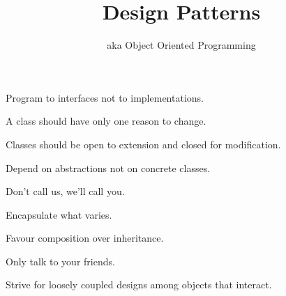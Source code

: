 \documentclass{beamer}
\title{Design Patterns}
\subtitle{aka Object Oriented Programming}
\begin{document}
\begin{frame}
  \titlepage
\end{frame}

\begin{frame}{Program to interfaces not to implementations.}
    \begin{itemize}
    \end{itemize}
\end{frame}

\begin{frame}{A class should have only one reason to change.}
    \begin{itemize}
    \end{itemize}
\end{frame}

\begin{frame}{Classes should be open to extension and closed for modification.}
    \begin{itemize}
    \end{itemize}
\end{frame}

\begin{frame}{Depend on abstractions not on concrete classes.}
    \begin{itemize}
    \end{itemize}
\end{frame}

\begin{frame}{Don't call us, we'll call you.}
    \begin{itemize}
    \end{itemize}
\end{frame}

\begin{frame}{Encapsulate what varies.}
    \begin{itemize}
    \end{itemize}
\end{frame}

\begin{frame}{Favour composition over inheritance.}
    \begin{itemize}
    \end{itemize}
\end{frame}

\begin{frame}{Only talk to your friends.}
    \begin{itemize}
    \end{itemize}
\end{frame}

\begin{frame}{Strive for loosely coupled designs among objects that interact.}
    \begin{itemize}
    \end{itemize}
\end{frame}
\end{document}
